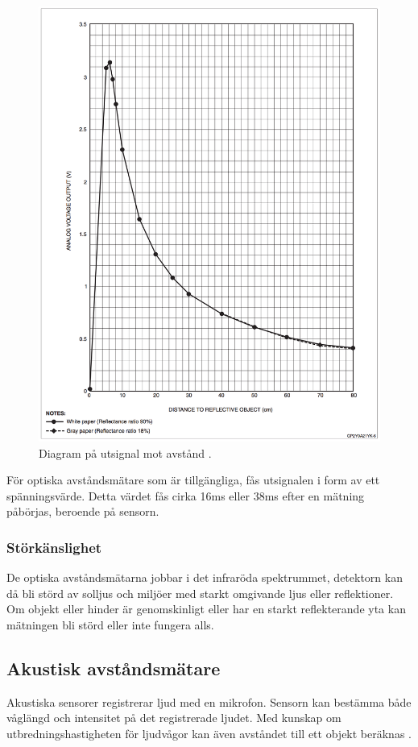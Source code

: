 \documentclass[11pt]{article}
\begin{document}
\begin{flushleft}
\begin{figure}[H]
\centering
\includegraphics[scale=0.28]{diagram}
\caption{Diagram på utsignal mot avstånd \autocite{diagram1}.}
\label{fig:diagram}
\end{figure}

För optiska avståndsmätare som är tillgängliga, fås utsignalen i form av ett spänningsvärde. Detta värdet fås cirka 16ms eller 38ms efter en mätning påbörjas, beroende på sensorn.

\subsubsection{Störkänslighet}
De optiska avståndsmätarna jobbar i det infraröda spektrummet, detektorn kan då bli störd av solljus och miljöer med starkt omgivande ljus eller reflektioner. Om objekt eller hinder är genomskinligt eller har en starkt reflekterande yta kan mätningen bli störd eller inte fungera alls.    

 \subsection{Akustisk avståndsmätare}
 Akustiska sensorer registrerar ljud med en mikrofon. Sensorn kan bestämma både våglängd och intensitet på det registrerade ljudet. Med kunskap om utbredningshastigheten för ljudvågor kan även avståndet till ett objekt beräknas \autocite{spridning}.
\\[0.1in]
 

\end{flushleft}
\end{document}
